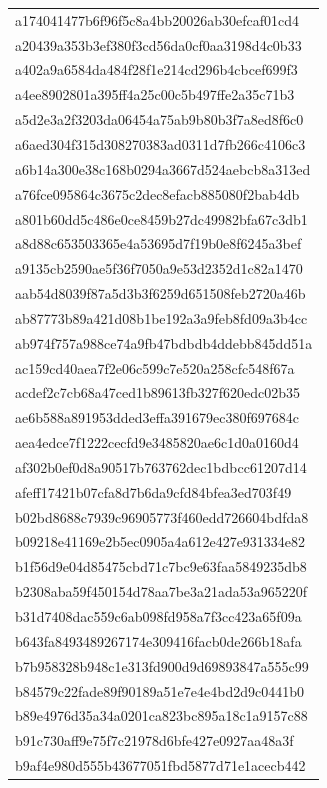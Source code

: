 \begin{tabular}{l}
a174041477b6f96f5c8a4bb20026ab30efcaf01cd4 \\
a20439a353b3ef380f3cd56da0cf0aa3198d4c0b33 \\
a402a9a6584da484f28f1e214cd296b4cbcef699f3 \\
a4ee8902801a395ff4a25c00c5b497ffe2a35c71b3 \\
a5d2e3a2f3203da06454a75ab9b80b3f7a8ed8f6c0 \\
a6aed304f315d308270383ad0311d7fb266c4106c3 \\
a6b14a300e38c168b0294a3667d524aebcb8a313ed \\
a76fce095864c3675c2dec8efacb885080f2bab4db \\
a801b60dd5c486e0ce8459b27dc49982bfa67c3db1 \\
a8d88c653503365e4a53695d7f19b0e8f6245a3bef \\
a9135cb2590ae5f36f7050a9e53d2352d1c82a1470 \\
aab54d8039f87a5d3b3f6259d651508feb2720a46b \\
ab87773b89a421d08b1be192a3a9feb8fd09a3b4cc \\
ab974f757a988ce74a9fb47bdbdb4ddebb845dd51a \\
ac159cd40aea7f2e06c599c7e520a258cfc548f67a \\
acdef2c7cb68a47ced1b89613fb327f620edc02b35 \\
ae6b588a891953dded3effa391679ec380f697684c \\
aea4edce7f1222cecfd9e3485820ae6c1d0a0160d4 \\
af302b0ef0d8a90517b763762dec1bdbcc61207d14 \\
afeff17421b07cfa8d7b6da9cfd84bfea3ed703f49 \\
b02bd8688c7939c96905773f460edd726604bdfda8 \\
b09218e41169e2b5ec0905a4a612e427e931334e82 \\
b1f56d9e04d85475cbd71c7bc9e63faa5849235db8 \\
b2308aba59f450154d78aa7be3a21ada53a965220f \\
b31d7408dac559c6ab098fd958a7f3cc423a65f09a \\
b643fa8493489267174e309416facb0de266b18afa \\
b7b958328b948c1e313fd900d9d69893847a555c99 \\
b84579c22fade89f90189a51e7e4e4bd2d9c0441b0 \\
b89e4976d35a34a0201ca823bc895a18c1a9157c88 \\
b91c730aff9e75f7c21978d6bfe427e0927aa48a3f \\
b9af4e980d555b43677051fbd5877d71e1acecb442 \\

\end{tabular}
